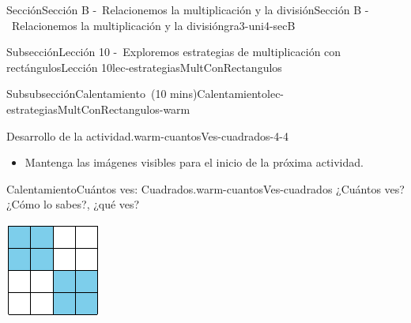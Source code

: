 \documentclass[oneside,10pt,]{article}
\begin{document}
\begin{sectionptx}{Sección}{Sección B -~Relacionemos la multiplicación y la división}{}{Sección B -~Relacionemos la multiplicación y la división}{}{}{gra3-uni4-secB}
\begin{subsectionptx}{Subsección}{Lección 10 -~Exploremos estrategias de multiplicación con rectángulos}{}{Lección 10}{}{}{lec-estrategiasMultConRectangulos}
\begin{subsubsectionptx}{Subsubsección}{Calentamiento~(10 mins)}{}{Calentamiento}{}{}{lec-estrategiasMultConRectangulos-warm}
\begin{paragraphs}{Desarrollo de la actividad.}{warm-cuantosVes-cuadrados-4-4}
\begin{itemize}[label=\textbullet]
\item{}Mantenga las imágenes visibles para el inicio de la próxima actividad.%
\end{itemize}
\end{paragraphs}%
\begin{exploration}{Calentamiento}{Cuántos ves: Cuadrados.}{warm-cuantosVes-cuadrados}%
¿Cuántos ves?\\
 ¿Cómo lo sabes?, ¿qué ves?%
\begin{sidebyside}{3}{0}{0}{0.05}%
\begin{sbspanel}{0.3}%
\includegraphics[width=\linewidth]{external/svg-source/tikz-file-147481.pdf}
\end{sbspanel}%
\begin{sbspanel}{0.3}%

\end{sbspanel}
\end{sidebyside}
\end{exploration}
\end{subsubsectionptx}
\end{subsectionptx}
\end{sectionptx}
\end{document}
